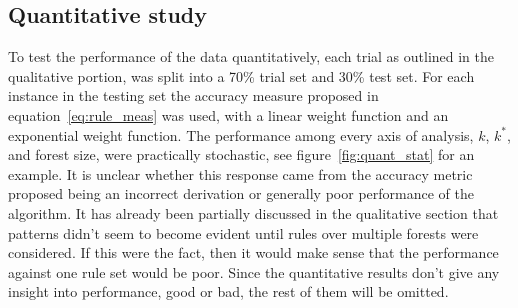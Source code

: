 \documentclass[10pt]{article}
\begin{document}
\subsection{Quantitative study}
To test the performance of the data quantitatively, each trial as outlined in the qualitative portion, was split into a 70\% trial set and 30\% test set. For each instance in the testing set the accuracy measure proposed in equation~\ref{eq:rule_meas} was used, with a linear weight function and an exponential weight function. The performance among every axis of analysis, $k$, $k^*$, and forest size, were practically stochastic, see figure~\ref{fig:quant_stat} for an example. It is unclear whether this response came from the accuracy metric proposed being an incorrect derivation or generally poor performance of the algorithm. It has already been partially discussed in the qualitative section that patterns didn't seem to become evident until rules over multiple forests were considered. If this were the fact, then it would make sense that the performance against one rule set would be poor. Since the quantitative results don't give any insight into performance, good or bad, the rest of them will be omitted. 
\end{document}
